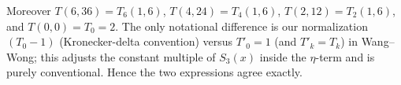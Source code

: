 \documentclass[12pt]{article}
\begin{document}
Moreover $T(6,36)=T_{6}(1,6)$, $T(4,24)=T_{4}(1,6)$, $T(2,12)=T_{2}(1,6)$, and $T(0,0)=T_{0}=2$. The only notational difference is our normalization $(T_{0}-1)$ (Kronecker-delta convention) versus $T'_{0} = 1$ (and $T'_k = T_k$) in Wang--Wong; this adjusts the constant multiple of $S_{3}(x)$ inside the $\eta$-term and is purely conventional. Hence the two expressions agree exactly.
\end{document}
